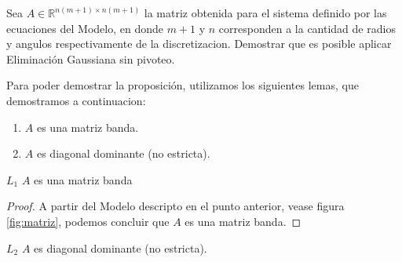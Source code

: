 \begin{proposition}
    Sea $A \in \mathbb{R}^{n(m+1) \times n(m+1)}$ la matriz obtenida para el sistema definido por las ecuaciones del Modelo, en donde $m+1$ y $n$ corresponden a la cantidad de radios y angulos respectivamente de la discretizacion. Demostrar que es posible aplicar Eliminación Gaussiana sin pivoteo.
\end{proposition}

Para poder demostrar la proposición, utilizamos los siguientes lemas, que demostramos a continuacion:

  \begin{enumerate}[label=(\subscript{L}{\arabic*})]
    \item $A$ es una matriz banda.
    \item $A$ es diagonal dominante (no estricta).

  \end{enumerate}

  \begin{customlemma}{$L_{1}$}
    $A$ es una matriz banda
  \end{customlemma}

  \begin{proof}
    A partir del Modelo descripto en el punto anterior, vease figura \ref{fig:matriz}, podemos concluir que $A$ es una matriz banda.
  \end{proof}

  \begin{customlemma}{$L_{2}$}
    $A$ es diagonal dominante (no estricta).
  \end{customlemma}

